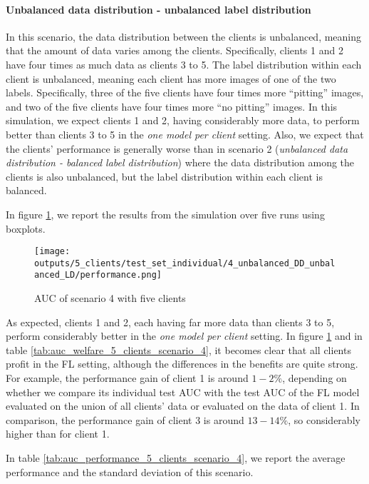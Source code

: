 \paragraph*{Unbalanced data distribution - unbalanced label distribution} In this scenario, the data distribution between the clients is unbalanced, meaning that the amount of data varies among the clients. Specifically, clients 1 and 2 have four times as much data as clients 3 to 5. The label distribution within each client is unbalanced, meaning each client has more images of one of the two labels. Specifically, three of the five clients have four times more ``pitting'' images, and two of the five clients have four times more ``no pitting'' images. In this simulation, we expect clients 1 and 2, having considerably more data, to perform better than clients 3 to 5 in the \emph{one model per client} setting. Also, we expect that the clients' performance is generally worse than in scenario 2 (\emph{unbalanced data distribution - balanced label distribution}) where the data distribution among the clients is also unbalanced, but the label distribution within each client is balanced.

In figure \ref{fig:auc_box_5_clients_scenario_4}, we report the results from the simulation over five runs using boxplots.
\begin{figure}[htb!]
    \centering
    \texttt{[image: outputs/5\_clients/test\_set\_individual/4\_unbalanced\_DD\_unbalanced\_LD/performance.png]}
    \caption{AUC of scenario 4 with five clients}
    \label{fig:auc_box_5_clients_scenario_4}
\end{figure}
As expected, clients 1 and 2, each having far more data than clients 3 to 5, perform considerably better in the \emph{one model per client} setting. In figure \ref{fig:auc_box_5_clients_scenario_4} and in table \ref{tab:auc_welfare_5_clients_scenario_4}, it becomes clear that all clients profit in the FL setting, although the differences in the benefits are quite strong. For example, the performance gain of client 1 is around $1 - 2\%$, depending on whether we compare its individual test AUC with the test AUC of the FL model evaluated on the union of all clients' data or evaluated on the data of client 1. In comparison, the performance gain of client 3 is around $13 - 14\%$, so considerably higher than for client 1.

In table \ref{tab:auc_performance_5_clients_scenario_4}, we report the average performance and the standard deviation of this scenario.


